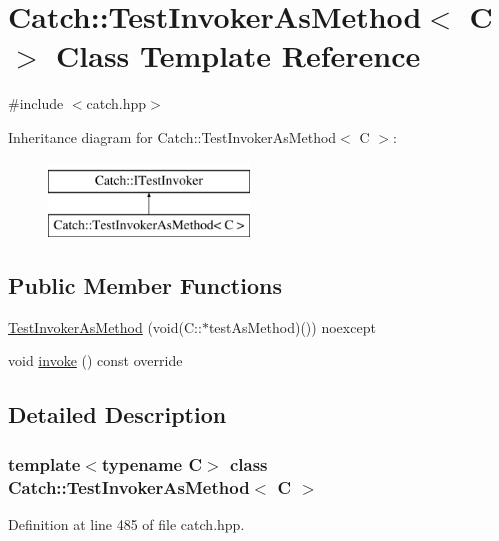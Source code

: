 \hypertarget{class_catch_1_1_test_invoker_as_method}{}\section{Catch\+:\+:Test\+Invoker\+As\+Method$<$ C $>$ Class Template Reference}
\label{class_catch_1_1_test_invoker_as_method}


{\ttfamily \#include $<$catch.\+hpp$>$}

Inheritance diagram for Catch\+:\+:Test\+Invoker\+As\+Method$<$ C $>$\+:\begin{figure}[H]
\begin{center}
\leavevmode
\includegraphics[height=2.000000cm]{class_catch_1_1_test_invoker_as_method}
\end{center}
\end{figure}
\subsection*{Public Member Functions}
\begin{DoxyCompactItemize}
\item 
\mbox{\hyperlink{class_catch_1_1_test_invoker_as_method_a119c4bdbbdd95c42859c18541987a1a4}{Test\+Invoker\+As\+Method}} (void(C\+::$\ast$test\+As\+Method)()) noexcept
\item 
void \mbox{\hyperlink{class_catch_1_1_test_invoker_as_method_a8115a06efe273f4112ec0b5452c1b5f2}{invoke}} () const override
\end{DoxyCompactItemize}


\subsection{Detailed Description}
\subsubsection*{template$<$typename C$>$\newline
class Catch\+::\+Test\+Invoker\+As\+Method$<$ C $>$}



Definition at line 485 of file catch.\+hpp.



